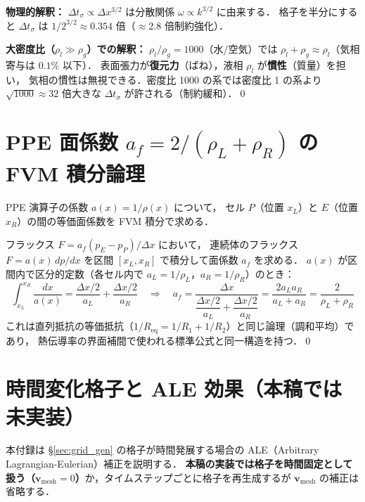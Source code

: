 \textbf{物理的解釈：} $\Delta t_\sigma \propto \Delta x^{3/2}$ は分散関係 $\omega \propto k^{3/2}$ に由来する．
格子を半分にすると $\Delta t_\sigma$ は $1/2^{3/2} \approx 0.354$ 倍（$\approx 2.8$ 倍制約強化）．

\medskip
\textbf{大密度比（$\rho_l \gg \rho_g$）での解釈：}
$\rho_l/\rho_g = 1000$（水/空気）では $\rho_l + \rho_g \approx \rho_l$（気相寄与は $0.1\%$ 以下）．
表面張力が\textbf{復元力}（ばね），液相 $\rho_l$ が\textbf{慣性}（質量）を担い，
気相の慣性は無視できる．密度比 1000 の系では密度比 1 の系より
$\sqrt{1000} \approx 32$ 倍大きな $\Delta t_\sigma$ が許される（制約緩和）．\qed

\section{\texorpdfstring{PPE 面係数 $a_f = 2/(\rho_L+\rho_R)$ の FVM 積分論理}{PPE 面係数 a\_f = 2/(ρ\_L+ρ\_R) の FVM 積分論理}}
\label{app:fvm_face_coeff}

PPE 演算子の係数 $a(x) = 1/\rho(x)$ について，
セル $P$（位置 $x_L$）と $E$（位置 $x_R$）の間の等価面係数を FVM 積分で求める．

フラックス $F = a_f(p_E - p_P)/\Delta x$ において，
連続体のフラックス $F = a(x)\,dp/dx$ を区間 $[x_L, x_R]$ で積分して面係数 $a_f$ を求める．
$a(x)$ が区間内で区分的定数（各セル内で $a_L = 1/\rho_L$，$a_R = 1/\rho_R$）のとき：
\[
  \int_{x_L}^{x_R} \frac{dx}{a(x)}
  = \frac{\Delta x/2}{a_L} + \frac{\Delta x/2}{a_R}
  \quad\Rightarrow\quad
  a_f = \frac{\Delta x}{\dfrac{\Delta x/2}{a_L}+\dfrac{\Delta x/2}{a_R}}
  = \frac{2a_L a_R}{a_L+a_R}
  = \frac{2}{\rho_L+\rho_R}
\]
これは直列抵抗の等価抵抗（$1/R_\mathrm{eq} = 1/R_1+1/R_2$）と同じ論理（調和平均）であり，
熱伝導率の界面補間で使われる標準公式と同一構造を持つ．\qed

\section{時間変化格子と ALE 効果（本稿では未実装）}
\label{app:grid_ale}

本付録は §\ref{sec:grid_gen} の格子が時間発展する場合の ALE（Arbitrary Lagrangian-Eulerian）補正を説明する．
\textbf{本稿の実装では格子を時間固定として扱う（$\bm{v}_\text{mesh} = 0$）}か，タイムステップごとに格子を再生成するが $\bm{v}_\text{mesh}$ の補正は省略する．

